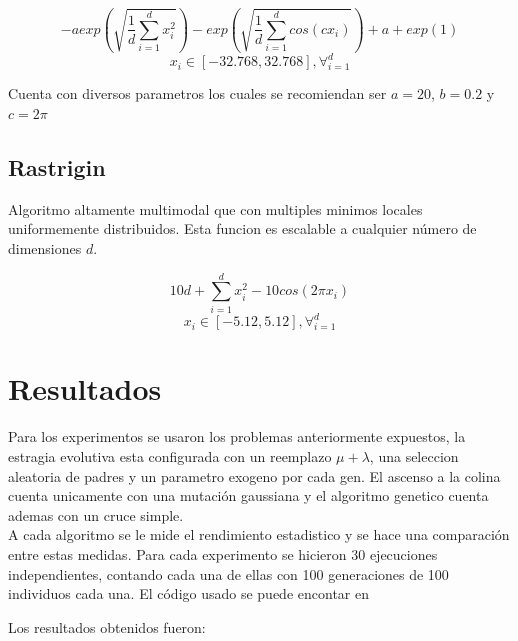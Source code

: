 \documentclass[twocolumn]{IEEEtran}
\begin{document}
$$
-a exp(\sqrt{\frac{1}{d} \sum_{i=1}^d{x_i^2}})
- exp(\sqrt{\frac{1}{d} \sum_{i=1}^d{cos(c x_i)}}) + a + exp(1)
$$
$$ x_i \in [-32.768, 32.768], \forall_{i=1}^d$$

Cuenta con diversos parametros los cuales se recomiendan ser $a=20$, $b=0.2$ y $c=2\pi$

\subsection{Rastrigin}

Algoritmo altamente multimodal que con multiples minimos locales uniformemente distribuidos.
Esta funcion es escalable a cualquier número de dimensiones $d$.

$$10d + \sum_{i=1}^d{x_i^2 - 10cos(2\pi x_i)}$$
$$ x_i \in [-5.12, 5.12], \forall_{i=1}^d$$

\section{Resultados}

Para los experimentos se usaron los problemas anteriormente expuestos,
la estragia evolutiva esta configurada con un reemplazo $\mu + \lambda$, una seleccion aleatoria 
de padres y un parametro exogeno por cada gen.
El ascenso a la colina cuenta unicamente con una mutación gaussiana y el algoritmo genetico 
cuenta ademas con un cruce simple. \\

A cada algoritmo se le mide el rendimiento estadistico y se hace una comparación entre estas medidas.
Para cada experimento se hicieron 30 ejecuciones independientes, 
contando cada una de ellas con 100 generaciones de 100 individuos cada una.
El código usado se puede encontar en

Los resultados obtenidos fueron:
\end{document}
